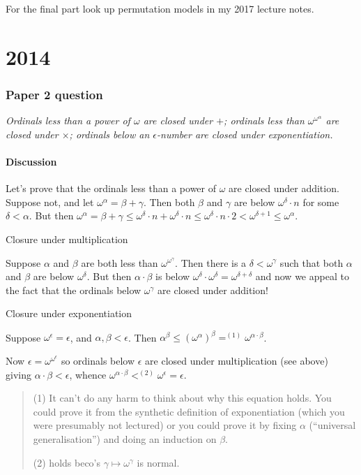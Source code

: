 \documentclass{book}
\begin{document}
For the final part look up permutation models in my 2017 lecture notes.
\chapter{2014}

\subsection*{Paper 2 question}

{\sl Ordinals less than a power of $\omega$ are closed under $+$; ordinals
less than $\omega^{\omega^\alpha}$ are closed under $\times$; ordinals
below an $\epsilon$-number are closed under exponentiation.}

\subsubsection*{Discussion}

Let's prove that the ordinals less than a power of $\omega$ are closed
under addition.  Suppose not, and let $\omega^\alpha = \beta+ \gamma$.
Then both $\beta$ and $\gamma$ are below $\omega^\delta \cdot n$ for
some $\delta < \alpha$.  But then $\omega^\alpha = \beta + \gamma \leq
\omega^\delta \cdot n + \omega^\delta \cdot n \leq \omega^\delta \cdot
n\cdot 2 < \omega^{\delta + 1} \leq \omega^\alpha$.

\medskip

Closure under multiplication

\smallskip

Suppose $\alpha$ and $\beta$ are both less than $\omega^{\omega^\gamma}$.  
Then there is a $\delta < \omega^\gamma$ such that both $\alpha$ and 
$\beta$ are below $\omega^\delta$.  But then $\alpha \cdot \beta$ is 
below $\omega^\delta \cdot \omega^\delta = \omega^{\delta + \delta}$ and 
now we appeal to the fact that the ordinals below $\omega^\gamma$ are 
closed under addition!

\medskip

Closure under exponentiation

\smallskip

Suppose $\omega^\epsilon = \epsilon$, and $\alpha, \beta < \epsilon$.
Then $\alpha^\beta \leq (\omega^\alpha)^\beta =^{(1)} \omega^{\alpha \cdot \beta}$.  

Now $\epsilon = \omega^{\omega^\epsilon}$ so ordinals below $\epsilon$
are closed under multiplication (see above) giving $\alpha\cdot\beta <
\epsilon$, whence $\omega^{\alpha \cdot \beta} <^{(2)} \omega^\epsilon
= \epsilon$.
\begin{quote}
  (1) It can't do any harm to think about why this equation holds. You
  could prove it from the synthetic definition of exponentiation
  (which you were presumably not lectured) or you could prove it by
  fixing $\alpha$ (``universal generalisation'') and doing an
  induction on $\beta$.

(2) holds beco's $\gamma \mapsto \omega^\gamma$ is normal.
\end{quote}
\end{document}
